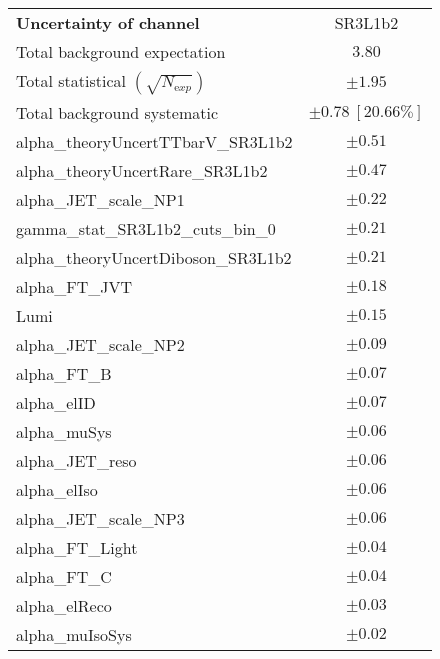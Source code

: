 
\begin{table}
\begin{center}
\setlength{\tabcolsep}{0.0pc}
\begin{tabular*}{\textwidth}{@{\extracolsep{\fill}}lc}
\noalign{\smallskip}\hline\noalign{\smallskip}
{\bfseries Uncertainty of channel}                                    & SR3L1b2            \\
\noalign{\smallskip}\hline\noalign{\smallskip}
Total background expectation             &  $3.80$       \\
\noalign{\smallskip}\hline\noalign{\smallskip}
Total statistical $(\sqrt{N_{\mathrm exp}})$              & $\pm 1.95$       \\
Total background systematic               & $\pm 0.78\ [20.66\%] $             \\
\noalign{\smallskip}\hline\noalign{\smallskip}
\noalign{\smallskip}\hline\noalign{\smallskip}
alpha\_theoryUncertTTbarV\_SR3L1b2         & $\pm 0.51$       \\
alpha\_theoryUncertRare\_SR3L1b2         & $\pm 0.47$       \\
alpha\_JET\_scale\_NP1         & $\pm 0.22$       \\
gamma\_stat\_SR3L1b2\_cuts\_bin\_0         & $\pm 0.21$       \\
alpha\_theoryUncertDiboson\_SR3L1b2         & $\pm 0.21$       \\
alpha\_FT\_JVT         & $\pm 0.18$       \\
Lumi         & $\pm 0.15$       \\
alpha\_JET\_scale\_NP2         & $\pm 0.09$       \\
alpha\_FT\_B         & $\pm 0.07$       \\
alpha\_elID         & $\pm 0.07$       \\
alpha\_muSys         & $\pm 0.06$       \\
alpha\_JET\_reso         & $\pm 0.06$       \\
alpha\_elIso         & $\pm 0.06$       \\
alpha\_JET\_scale\_NP3         & $\pm 0.06$       \\
alpha\_FT\_Light         & $\pm 0.04$       \\
alpha\_FT\_C         & $\pm 0.04$       \\
alpha\_elReco         & $\pm 0.03$       \\
alpha\_muIsoSys         & $\pm 0.02$       \\

\end{tabular*}
\end{center}
\end{table}
